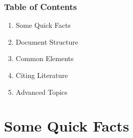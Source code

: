 \documentclass[xcolor={dvipsnames}]{beamer}
\begin{document}
\begin{frame}
\frametitle{Table of Contents}
\begin{center}
\begin{enumerate}
\setlength{\parskip}{0.5cm}
\item Some Quick Facts
\item Document Structure
\item Common Elements
\item Citing Literature
\item Advanced Topics
\end{enumerate}
\end{center}
\end{frame}
\section{Some Quick Facts}
\end{document}
